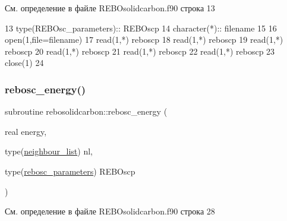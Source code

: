 См. определение в файле R\+E\+B\+Osolidcarbon.\+f90 строка 13


\begin{DoxyCode}
13     \textcolor{keywordtype}{type}(REBOsc\_parameters):: REBOscp
14     \textcolor{keywordtype}{character(*)}::  filename
15 
16     \textcolor{keyword}{open}(1,file=filename)
17     \textcolor{keyword}{read}(1,*) reboscp%
18     \textcolor{keyword}{read}(1,*) reboscp%
19     \textcolor{keyword}{read}(1,*) reboscp%
20     \textcolor{keyword}{read}(1,*) reboscp%
21     \textcolor{keyword}{read}(1,*) reboscp%
22     \textcolor{keyword}{read}(1,*) reboscp%
23     \textcolor{keyword}{close}(1)
24     
\end{DoxyCode}
\mbox{\label{namespacerebosolidcarbon_a300f2042f4b21284cfa42c0e4de3f0a8}} 
\subsubsection{\texorpdfstring{rebosc\+\_\+energy()}{rebosc\_energy()}}
{\footnotesize\ttfamily subroutine rebosolidcarbon\+::rebosc\+\_\+energy (\begin{DoxyParamCaption}\item[{real}]{energy,  }\item[{type(\mbox{\hyperlink{structmd__general_1_1neighbour__list}{neighbour\+\_\+list}})}]{nl,  }\item[{type(\mbox{\hyperlink{structrebosolidcarbon_1_1rebosc__parameters}{rebosc\+\_\+parameters}})}]{R\+E\+B\+Oscp }\end{DoxyParamCaption})}



См. определение в файле R\+E\+B\+Osolidcarbon.\+f90 строка 28


